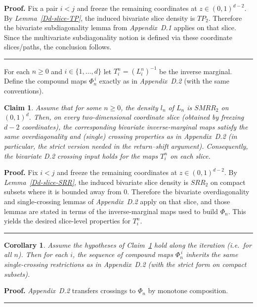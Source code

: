 \documentclass[onecolumn]{article}
\newtheorem{claim}[theorem]{Claim}
\newtheorem{corollary}[theorem]{Corollary}
\newenvironment{proof}[1][Proof]{\noindent\textbf{#1.} }{\ \rule{0.5em}{0.5em}}
\begin{document}
\begin{proof}
Fix a pair $i<j$ and freeze the remaining coordinates at $z\in (0,1)^{d-2}$.
By \textit{Lemma~\ref{Dd-slice-TP}}, the induced bivariate slice density is $%
TP_{2}$. Therefore the bivariate subdiagonality lemma from \textit{%
Appendix~D.1} applies on that slice. Since the multivariate subdiagonality
notion is defined via these coordinate slices/paths, the conclusion follows.
\medskip
\end{proof}

For each $n\geq 0$ and $i\in \{1,\dots ,d\}$ let $T_{i}^{n}=(L_{i}^{n})^{-1}$
be the inverse marginal. Define the compound maps $\Phi _{n}^{\,i}$ exactly
as in \textit{Appendix~D.2} (with the same conventions).

\begin{claim}
\label{Dd-overdiag-T} Assume that for some $n\geq 0$, the density $l_{n}$ of 
$L_{n}$ is $SMRR_{2}$ on $(0,1)^{d}$. Then, on every two-dimensional
coordinate slice (obtained by freezing $d-2$ coordinates), the corresponding
bivariate inverse-marginal maps satisfy the same overdiagonality and
(single) crossing properties as in Appendix~D.2 (in particular, the strict
version needed in the return--shift argument). Consequently, the bivariate
D.2 crossing input holds for the maps $T_{i}^{n}$ on each slice.
\end{claim}

\begin{proof}
Fix $i<j$ and freeze the remaining coordinates at $z\in (0,1)^{d-2}$. By 
\textit{Lemma~\ref{Dd-slice-SRR}}, the induced bivariate slice density is $%
SRR_{2}$ on compact subsets where it is bounded away from $0$. Therefore the
bivariate overdiagonality and single-crossing lemmas of \textit{Appendix~D.2}
apply on that slice, and those lemmas are stated in terms of the
inverse-marginal maps used to build $\Phi _{n}$. This yields the desired
slice-level properties for $T_{i}^{n}$. \medskip
\end{proof}

\begin{corollary}
\label{Dd-phi-crossing} Assume the hypotheses of Claim~\ref{Dd-overdiag-T}
hold along the iteration (i.e.\ for all $n$). Then for each $i$, the
sequence of compound maps $\Phi _{n}^{\,i}$ inherits the same
single-crossing restrictions as in Appendix~D.2 (with the strict form on
compact subsets).
\end{corollary}

\begin{proof}
\medskip \textit{Appendix~D.2} transfers crossings to $\Phi _{n}$ by
monotone composition.
\end{proof}
\end{document}
